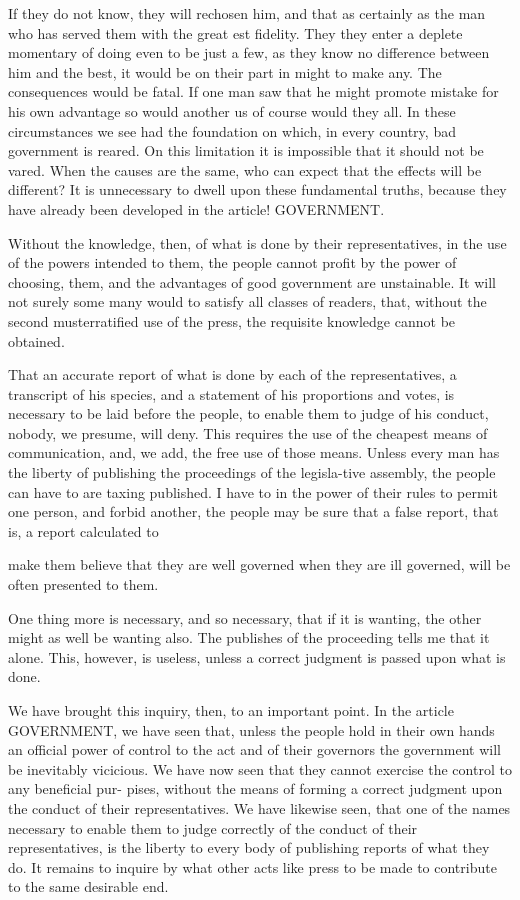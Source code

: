 If they do not know, they will rechosen him, and that as certainly as the man who has served them with the great est fidelity. They they enter a deplete momentary of doing even to be just a few, as they know no difference between him and the best, it would be on their part in might to make any. The consequences would be fatal. If one man saw that he might promote mistake for his own advantage so would another us of course would they all. In these circumstances we see had the foundation on which, in every country, bad government is reared. On this limitation it is impossible that it should not be vared. When the causes are the same, who can expect that the effects will be different? It is unnecessary to dwell upon these fundamental truths, because they have already been developed in the article! GOVERNMENT.\par\medskip
Without the knowledge, then, of what is done by their representatives, in the use of the powers intended to them, the people cannot profit by the power of choosing, them, and the advantages of good government are unstainable. It will not surely some many would to satisfy all classes of readers, that, without the second musterratified use of the press, the requisite knowledge cannot be obtained.\par\medskip
That an accurate report of what is done by each of the representatives, a transcript of his species, and a statement of his proportions and votes, is necessary to be laid before the people, to enable them to judge of his conduct, nobody, we presume, will deny. This requires the use of the cheapest means of communication, and, we add, the free use of those means. Unless every man has the liberty of publishing the proceedings of the legisla-tive assembly, the people can have to are taxing published. I have to in the power of their rules to permit one person, and forbid another, the people may be sure that a false report, that is, a report calculated to\par\medskip
make them believe that they are well governed when they are ill governed, will be often presented to them.\par\medskip
One thing more is necessary, and so necessary, that if it is wanting, the other might as well be wanting also. The publishes of the proceeding tells me that it alone. This, however, is useless, unless a correct judgment is passed upon what is done.\par\medskip
We have brought this inquiry, then, to an important point. In the article GOVERNMENT, we have seen that, unless the people hold in their own hands an official power of control to the act and of their governors the government will be inevitably vicicious. We have now seen that they cannot exercise the control to any beneficial pur- pises, without the means of forming a correct judgment upon the conduct of their representatives. We have likewise seen, that one of the names necessary to enable them to judge correctly of the conduct of their representatives, is the liberty to every body of publishing reports of what they do. It remains to inquire by what other acts like press to be made to contribute to the same desirable end.\par\medskip
